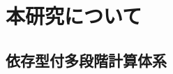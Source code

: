 \documentclass[dvipdfmx,aspectratio=169, 20pt]{beamer}
\renewcommand{\V}{\vdash}
\begin{document}
%

\section{本研究について}

\subsection{依存型付多段階計算体系 \LMD}
\end{document}
